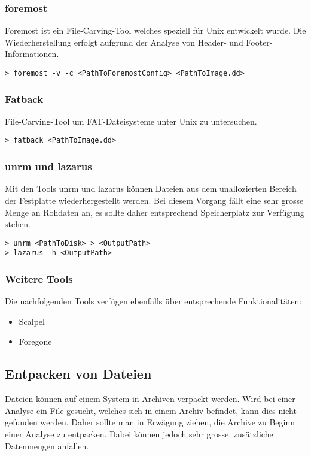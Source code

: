 \subsubsection{foremost}
Foremost ist ein File-Carving-Tool welches speziell für Unix entwickelt wurde. Die Wiederherstellung erfolgt aufgrund der Analyse von Header- und Footer-Informationen.

\begin{lstlisting}
> foremost -v -c <PathToForemostConfig> <PathToImage.dd>
\end{lstlisting}


\subsubsection{Fatback}
File-Carving-Tool um FAT-Dateisysteme unter Unix zu untersuchen.

\begin{lstlisting}
> fatback <PathToImage.dd>
\end{lstlisting}


\subsubsection{unrm und lazarus}
Mit den Tools unrm und lazarus können Dateien aus dem unallozierten Bereich der Festplatte wiederhergestellt werden. Bei diesem Vorgang fällt eine sehr grosse Menge an Rohdaten an, es sollte daher entsprechend Speicherplatz zur Verfügung stehen.
\begin{lstlisting}
> unrm <PathToDisk> > <OutputPath>
> lazarus -h <OutputPath>
\end{lstlisting}


\subsubsection{Weitere Tools} 
Die nachfolgenden Tools verfügen ebenfalls über entsprechende Funktionalitäten:
\begin{itemize}
\item Scalpel
\item Foregone
\end{itemize}

\subsection{Entpacken von Dateien}
Dateien können auf einem System in Archiven verpackt werden. Wird bei einer Analyse ein File gesucht, welches sich in einem Archiv befindet, kann dies nicht gefunden werden. Daher sollte man in Erwägung ziehen, die Archive zu Beginn einer Analyse zu entpacken. Dabei können jedoch sehr grosse, zusätzliche Datenmengen anfallen.

